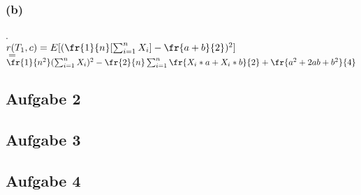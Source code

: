 \subsubsection*{(b)}.\\
\( r(T_1,c) = E[(\fr{1}{n}[\sum^n_{i=1}X_i] - \fr{a+b}{2})^2] \) \\
\( =  \) \( \fr{1}{n^2} ( \sum^n_{i=1}X_i )^2 - \fr{2}{n}\sum^n_{i=1}\fr{X_i*a + X_i*b}{2} + \fr{a^2 + 2ab + b^2}{4} \) \\

\subsection*{Aufgabe 2}

\subsection*{Aufgabe 3}

\subsection*{Aufgabe 4}
